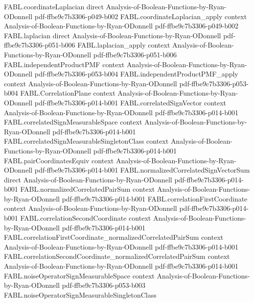 \begin{theorem}
\proofstep
  {FABL.coordinateLaplacian}
  {direct}
  {Analysis-of-Boolean-Functions-by-Ryan-ODonnell}
  {pdf-ffbe9c7b3306-p049-b002}
\proofstep
  {FABL.coordinateLaplacian_apply}
  {context}
  {Analysis-of-Boolean-Functions-by-Ryan-ODonnell}
  {pdf-ffbe9c7b3306-p049-b002}
\proofstep
  {FABL.laplacian}
  {direct}
  {Analysis-of-Boolean-Functions-by-Ryan-ODonnell}
  {pdf-ffbe9c7b3306-p051-b006}
\proofstep
  {FABL.laplacian_apply}
  {context}
  {Analysis-of-Boolean-Functions-by-Ryan-ODonnell}
  {pdf-ffbe9c7b3306-p051-b006}
\proofstep
  {FABL.independentProductPMF}
  {context}
  {Analysis-of-Boolean-Functions-by-Ryan-ODonnell}
  {pdf-ffbe9c7b3306-p053-b004}
\proofstep
  {FABL.independentProductPMF_apply}
  {context}
  {Analysis-of-Boolean-Functions-by-Ryan-ODonnell}
  {pdf-ffbe9c7b3306-p053-b004}
\proofstep
  {FABL.CorrelationPlane}
  {context}
  {Analysis-of-Boolean-Functions-by-Ryan-ODonnell}
  {pdf-ffbe9c7b3306-p014-b001}
\proofstep
  {FABL.correlatedSignVector}
  {context}
  {Analysis-of-Boolean-Functions-by-Ryan-ODonnell}
  {pdf-ffbe9c7b3306-p014-b001}
\proofstep
  {FABL.correlatedSignMeasurableSpace}
  {context}
  {Analysis-of-Boolean-Functions-by-Ryan-ODonnell}
  {pdf-ffbe9c7b3306-p014-b001}
\proofstep
  {FABL.correlatedSignMeasurableSingletonClass}
  {context}
  {Analysis-of-Boolean-Functions-by-Ryan-ODonnell}
  {pdf-ffbe9c7b3306-p014-b001}
\proofstep
  {FABL.pairCoordinatesEquiv}
  {context}
  {Analysis-of-Boolean-Functions-by-Ryan-ODonnell}
  {pdf-ffbe9c7b3306-p014-b001}
\proofstep
  {FABL.normalizedCorrelatedSignVectorSum}
  {direct}
  {Analysis-of-Boolean-Functions-by-Ryan-ODonnell}
  {pdf-ffbe9c7b3306-p014-b001}
\proofstep
  {FABL.normalizedCorrelatedPairSum}
  {context}
  {Analysis-of-Boolean-Functions-by-Ryan-ODonnell}
  {pdf-ffbe9c7b3306-p014-b001}
\proofstep
  {FABL.correlationFirstCoordinate}
  {context}
  {Analysis-of-Boolean-Functions-by-Ryan-ODonnell}
  {pdf-ffbe9c7b3306-p014-b001}
\proofstep
  {FABL.correlationSecondCoordinate}
  {context}
  {Analysis-of-Boolean-Functions-by-Ryan-ODonnell}
  {pdf-ffbe9c7b3306-p014-b001}
\proofstep
  {FABL.correlationFirstCoordinate_normalizedCorrelatedPairSum}
  {context}
  {Analysis-of-Boolean-Functions-by-Ryan-ODonnell}
  {pdf-ffbe9c7b3306-p014-b001}
\proofstep
  {FABL.correlationSecondCoordinate_normalizedCorrelatedPairSum}
  {context}
  {Analysis-of-Boolean-Functions-by-Ryan-ODonnell}
  {pdf-ffbe9c7b3306-p014-b001}
\proofstep
  {FABL.noiseOperatorSignMeasurableSpace}
  {context}
  {Analysis-of-Boolean-Functions-by-Ryan-ODonnell}
  {pdf-ffbe9c7b3306-p053-b003}
\proofstep
  {FABL.noiseOperatorSignMeasurableSingletonClass}

\end{theorem}
